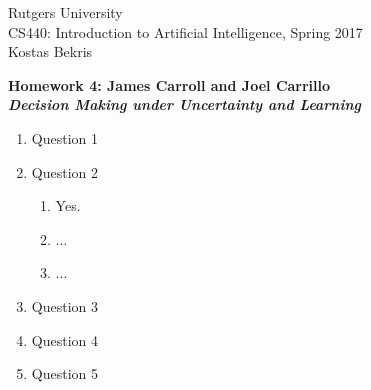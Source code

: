 \documentclass[11pt]{article}
\begin{document}
\sloppy

\noindent Rutgers University\\
CS440: Introduction to Artificial Intelligence, Spring 2017\\
Kostas Bekris\\

\begin{center}
\LARGE{\textbf{Homework 4: James Carroll and Joel Carrillo}}\\
\large{\textbf{\emph{Decision Making under Uncertainty and Learning}}}
\end{center}

\vspace{.1in}

\begin{enumerate}

\item Question 1
\item Question 2
\begin{enumerate}
\item Yes.
\item ...
\item ...
\end{enumerate}
\item Question 3
\item Question 4
\item Question 5

\end{enumerate}
\end{document}
